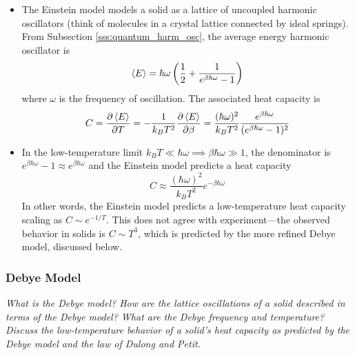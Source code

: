 \documentclass[11pt, a4paper]{article}
\begin{document}
\begin{itemize}
	\item The Einstein model models a solid as a lattice of uncoupled harmonic oscillators (think of molecules in a crystal lattice connected by ideal springs). From Subsection \ref{sss:quantum_harm_osc}, the average energy harmonic oscillator is
	\begin{equation*}
		\expval{E} = \hbar \omega \left(\frac{1}{2} + \frac{1}{e^{\beta \hbar \omega}-1}\right)
	\end{equation*}
	where $ \omega $ is the frequency of oscillation. The associated heat capacity is
	\begin{equation*}
		C = \pdv{\expval{E}}{T} =  -\frac{1}{k_{B}T^{2}} \pdv{\expval{E}}{\beta} = \frac{(\hbar \omega)^{2}}{k_{B}T^{2}}\frac{e^{\beta \hbar \omega}}{(e^{\beta \hbar \omega}-1)^{2}}
	\end{equation*}
	
	\item In the low-temperature limit $ k_{B}T \ll \hbar \omega \implies \beta \hbar \omega \gg 1 $, the denominator is $ e^{\beta \hbar \omega}-1 \approx e^{\beta \hbar \omega} $ and the Einstein model predicts a heat capacity
	\begin{equation*}
		C \approx \frac{(\hbar \omega)^{2}}{k_{B}T^{2}}e^{-\beta \hbar \omega}
	\end{equation*}
	In other words, the Einstein model predicts a low-temperature heat capacity scaling as $ C \sim e^{-1/T}$. This does not agree with experiment---the observed behavior in solids is $ C \sim T^{3} $, which is predicted by the more refined Debye model, discussed below.
	
\end{itemize}

\subsubsection{Debye Model}
\textit{What is the Debye model? How are the lattice oscillations of a solid described in terms of the Debye model? What are the Debye frequency and temperature? Discuss the low-temperature behavior of a solid's heat capacity as predicted by the Debye model and the law of Dulong and Petit.}
\end{document}
